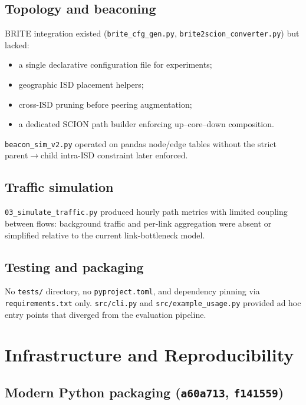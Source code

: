 \documentclass[11pt,a4paper,twoside,openright]{report}
\begin{document}
\section{Topology and beaconing}

BRITE integration existed (\texttt{brite\_cfg\_gen.py},
\texttt{brite2scion\_converter.py}) but lacked:
\begin{itemize}
  \item a single declarative configuration file for experiments;
  \item geographic ISD placement helpers;
  \item cross-ISD pruning before peering augmentation;
  \item a dedicated SCION path builder enforcing up--core--down composition.
\end{itemize}
\texttt{beacon\_sim\_v2.py} operated on pandas node/edge tables without the
strict parent$\rightarrow$child intra-ISD constraint later enforced.

\section{Traffic simulation}

\texttt{03\_simulate\_traffic.py} produced hourly path metrics with limited
coupling between flows: background traffic and per-link aggregation were absent
or simplified relative to the current link-bottleneck model.

\section{Testing and packaging}

No \texttt{tests/} directory, no \texttt{pyproject.toml}, and dependency pinning
via \texttt{requirements.txt} only.
\texttt{src/cli.py} and \texttt{src/example\_usage.py} provided ad hoc entry points
that diverged from the evaluation pipeline.

\chapter{Infrastructure and Reproducibility}

\section{Modern Python packaging (\texttt{a60a713}, \texttt{f141559})}
\end{document}
